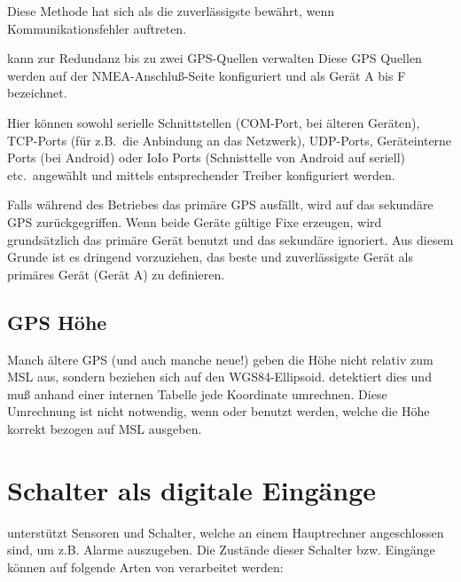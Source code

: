 Diese Methode hat sich als die zuverlässigste bewährt, wenn Kommunikationsfehler auftreten.

\xc kann zur Redundanz bis zu zwei GPS-Quellen verwalten
Diese GPS Quellen werden auf der NMEA-Anschluß-Seite konfiguriert
 und als Gerät A bis F bezeichnet. 

Hier können sowohl serielle Schnittstellen (COM-Port, bei älteren Geräten), TCP-Ports (für z.B.\ die Anbindung an das Netzwerk), UDP-Ports, Geräteinterne Ports (bei Android) oder IoIo Ports (Schnisttelle von Android auf seriell) etc.\ angewählt und mittels entsprechender Treiber konfiguriert werden.  


Falls während des Betriebes das primäre GPS ausfällt, wird auf das sekundäre GPS zurückgegriffen. Wenn beide Geräte gültige Fixe erzeugen, wird grundsätzlich das primäre Gerät benutzt und das sekundäre ignoriert.  Aus diesem Grunde ist es dringend vorzuziehen, das beste und zuverlässigste Gerät als primäres Gerät (Gerät A) zu definieren.

\subsection*{GPS Höhe}

Manch ältere GPS  (und auch manche neue!) geben die Höhe nicht relativ zum MSL aus, sondern beziehen sich auf den WGS84-Ellipsoid.  \xc detektiert dies und muß anhand einer internen Tabelle jede Koordinate umrechnen. Diese Umrechnung ist nicht notwendig, wenn \fl oder \al benutzt werden, welche die Höhe korrekt bezogen auf MSL ausgeben.
\section{Schalter als digitale Eingänge}

\xc unterstützt Sensoren und Schalter, welche an einem Hauptrechner angeschlossen sind, um z.B. Alarme auszugeben. Die Zustände dieser Schalter bzw. Eingänge können auf folgende Arten von \xc verarbeitet werden:

